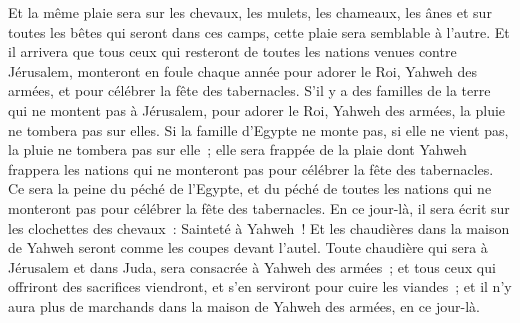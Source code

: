 \begin{multicols}{2}
Et la même plaie sera sur les chevaux, les mulets, les chameaux, les ânes et sur toutes les bêtes qui seront dans ces camps, cette plaie sera semblable à l'autre.
Et il arrivera que tous ceux qui resteront de toutes les nations venues contre Jérusalem, monteront en foule chaque année pour adorer le Roi, Yahweh des armées, et pour célébrer la fête des tabernacles.
S'il y a des familles de la terre qui ne montent pas à Jérusalem, pour adorer le Roi, Yahweh des armées, la pluie ne tombera pas sur elles.
Si la famille d'Egypte ne monte pas, si elle ne vient pas, la pluie ne tombera pas sur elle~; elle sera frappée de la plaie dont Yahweh frappera les nations qui ne monteront pas pour célébrer la fête des tabernacles.
Ce sera la peine du péché de l'Egypte, et du péché de toutes les nations qui ne monteront pas pour célébrer la fête des tabernacles.
En ce jour-là, il sera écrit sur les clochettes des chevaux~: Sainteté à Yahweh~! Et les chaudières dans la maison de Yahweh seront comme les coupes devant l'autel.
Toute chaudière qui sera à Jérusalem et dans Juda, sera consacrée à Yahweh des armées~; et tous ceux qui offriront des sacrifices viendront, et s'en serviront pour cuire les viandes~; et il n'y aura plus de marchands dans la maison de Yahweh des armées, en ce jour-là.
\PPE{}
\end{multicols}
